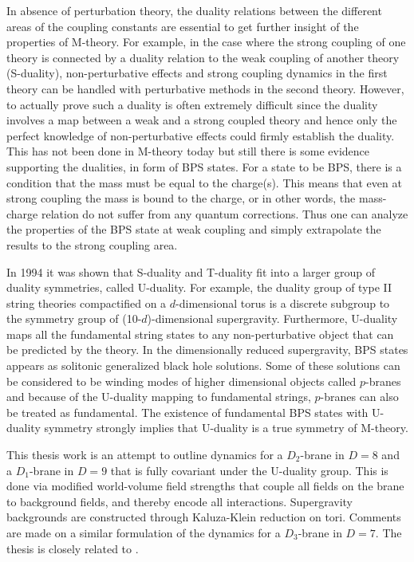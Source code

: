In absence of perturbation theory, the duality relations between the different areas of the coupling constants are essential to 
get further insight of the properties of M-theory. For example, in the case where the strong coupling of one theory is connected by 
a duality relation to the weak coupling of another theory (S-duality), non-perturbative effects and strong coupling dynamics in the 
first theory can be handled with perturbative methods in the second theory. However, to actually prove such a duality is 
often extremely difficult since the duality involves a map between a weak and a strong coupled theory and hence only the perfect 
knowledge of non-perturbative effects could firmly establish the duality. This has not been done in M-theory today but still 
there is some evidence supporting the dualities, in form of BPS states. For a state to be BPS, there is a condition that the mass 
must be equal to the charge(s). This means that even at strong coupling the mass is bound to the charge, or in other words, the 
mass-charge relation do not suffer from any quantum corrections. Thus one can analyze the properties of the BPS state at weak coupling 
and simply extrapolate the results to the strong coupling area. 

In 1994 it was shown that S-duality and T-duality fit into a larger group of duality symmetries, called U-duality. For example, 
the duality group of type II string theories compactified on a $d$-dimensional torus is a discrete subgroup to the symmetry group 
of (10-$d$)-dimensional supergravity. Furthermore, U-duality maps all the fundamental string states to any non-perturbative object that 
can be predicted by the theory. In the dimensionally reduced supergravity, BPS states appears as solitonic generalized black hole 
solutions. Some of these solutions can be considered to be winding modes of higher dimensional objects called $p$-branes and because 
of the U-duality mapping to fundamental strings, $p$-branes can also be treated as fundamental. The existence of fundamental BPS states 
with U-duality symmetry strongly implies that U-duality is a true symmetry of M-theory.

This thesis work is an attempt to outline dynamics for a $D_2$-brane in $D=8$ and a $D_1$-brane in $D=9$ that is fully 
covariant under the U-duality group. This is done via modified world-volume field strengths that couple all fields on the brane 
to background fields, and thereby encode all interactions. Supergravity backgrounds are constructed through Kaluza-Klein 
reduction on tori. Comments are made on a similar formulation of the dynamics for a $D_3$-brane in $D=7$. The thesis is closely 
related to \cite{artikeln}.


